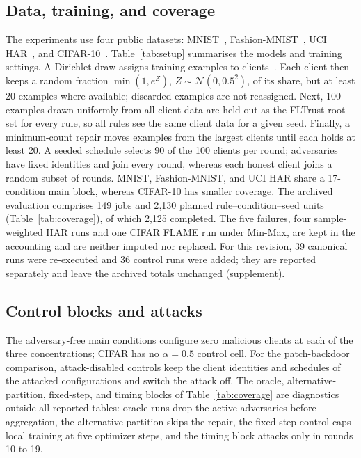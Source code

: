 \documentclass[journal]{IEEEtran}
\begin{document}
\subsection{Data, training, and coverage}
The experiments use four public datasets: MNIST~\cite{lecun1998}, Fashion-MNIST~\cite{xiao2017fmnist}, UCI HAR~\cite{anguita2013har}, and CIFAR-10~\cite{krizhevsky2009}. Table~\ref{tab:setup} summarises the models and training settings. A Dirichlet draw assigns training examples to clients~\cite{hsu2019}. Each client then keeps a random fraction $\min(1,e^{Z})$, $Z\sim\mathcal{N}(0,0.5^2)$, of its share, but at least 20 examples where available; discarded examples are not reassigned. Next, 100 examples drawn uniformly from all client data are held out as the FLTrust root set for every rule, so all rules see the same client data for a given seed. Finally, a minimum-count repair moves examples from the largest clients until each holds at least 20. A seeded schedule selects 90 of the 100 clients per round; adversaries have fixed identities and join every round, whereas each honest client joins a random subset of rounds. MNIST, Fashion-MNIST, and UCI HAR share a 17-condition main block, whereas CIFAR-10 has smaller coverage. The archived evaluation comprises 149 jobs and 2{,}130 planned rule--condition--seed units (Table~\ref{tab:coverage}), of which 2{,}125 completed. The five failures, four sample-weighted HAR runs and one CIFAR FLAME run under Min-Max, are kept in the accounting and are neither imputed nor replaced. For this revision, 39 canonical runs were re-executed and 36 control runs were added; they are reported separately and leave the archived totals unchanged (supplement).

\subsection{Control blocks and attacks}
The adversary-free main conditions configure zero malicious clients at each of the three concentrations; CIFAR has no $\alpha=0.5$ control cell. For the patch-backdoor comparison, attack-disabled controls keep the client identities and schedules of the attacked configurations and switch the attack off. The oracle, alternative-partition, fixed-step, and timing blocks of Table~\ref{tab:coverage} are diagnostics outside all reported tables: oracle runs drop the active adversaries before aggregation, the alternative partition skips the repair, the fixed-step control caps local training at five optimizer steps, and the timing block attacks only in rounds 10 to 19.
\end{document}
